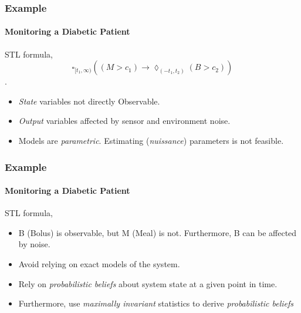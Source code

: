 \documentclass{beamer}
\newcommand{\always}[1]{\square_{#1}}
\newcommand{\eventually}[1]{\lozenge_{#1}}
\begin{document}
\begin{frame}
    \frametitle{Example}
    \framesubtitle{Monitoring a Diabetic Patient}

    STL formula, 
        $$ \always{ [ t_1, \infty )}
    \left( \left (M > c_1 \right ) \to \eventually{\left(-t_1, t_2 \right)}
    \left( B > c_2 \right ) \right)$$.
    \pause
    \begin{itemize}
        \item \textit{State} variables not directly Observable.
        \item \textit{Output} variables affected by sensor and environment noise.
        \item Models are \textit{parametric}. Estimating (\textit{nuissance}) parameters is not
            feasible.
    \end{itemize}
\end{frame}
\begin{frame}
    \frametitle{Example}
    \framesubtitle{Monitoring a Diabetic Patient}

    STL formula, 
    \begin{itemize}
        \item B (Bolus) is observable, but M (Meal) is not. Furthermore, B
            can be affected by noise.
        \pause
        \item Avoid relying on exact models of the system.
        \item Rely on \textit{probabilistic beliefs} about
            system state at a given point in time.
        \pause
        \item Furthermore, use \textit{maximally invariant} statistics
            to derive \textit{probabilistic beliefs}
    \end{itemize}

\end{frame}
\end{document}
